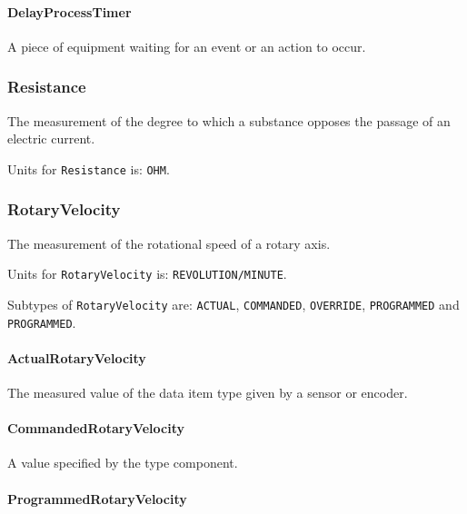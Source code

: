 \paragraph{DelayProcessTimer}\mbox{}
\label{sec:DelayProcessTimer}



A piece of equipment waiting for an event or an action to occur.


\subsubsection{Resistance}
\label{sec:Resistance}



The measurement of the degree to which a substance opposes the passage of an electric current.


Units for \texttt{Resistance} is: \texttt{OHM}.

\FloatBarrier

\subsubsection{RotaryVelocity}
\label{sec:RotaryVelocity}



The measurement of the rotational speed of a rotary axis.


Units for \texttt{RotaryVelocity} is: \texttt{REVOLUTION/MINUTE}.


Subtypes of \texttt{RotaryVelocity} are: \texttt{ACTUAL}, \texttt{COMMANDED}, \texttt{OVERRIDE}, \texttt{PROGRAMMED} and \texttt{PROGRAMMED}. 
\FloatBarrier

\paragraph{ActualRotaryVelocity}\mbox{}
\label{sec:ActualRotaryVelocity}



The measured value of the data item type given by a sensor or encoder.


\paragraph{CommandedRotaryVelocity}\mbox{}
\label{sec:CommandedRotaryVelocity}



A value specified by the  type component.


\paragraph{ProgrammedRotaryVelocity}\mbox{}
\label{sec:ProgrammedRotaryVelocity}



